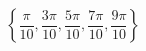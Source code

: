 \begin{displaymath}
 \left\lbrace \frac{\pi}{10}, \frac{3\pi}{10}, \frac{5\pi}{10}, \frac{7\pi}{10}, \frac{9\pi}{10}\right\rbrace 
\end{displaymath}
